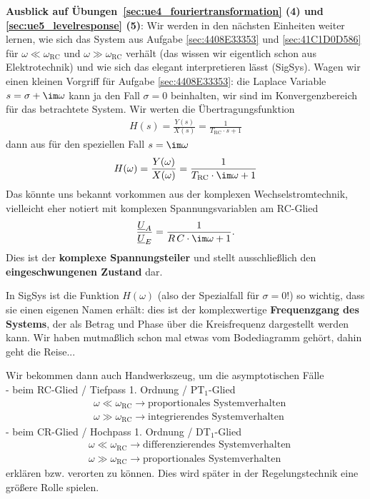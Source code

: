 \clearpage
\begin{mdframed}
\textbf{Ausblick auf Übungen~\ref{sec:ue4_fouriertransformation} (4) und
\ref{sec:ue5_levelresponse} (5)}:
Wir werden in den nächsten Einheiten weiter lernen, wie sich das System aus Aufgabe
\ref{sec:4408E33353} und \ref{sec:41C1D0D586}
für $\omega\ll\omega_\mathrm{RC}$ und $\omega\gg\omega_\mathrm{RC}$
verhält (das wissen wir eigentlich schon aus Elektrotechnik) und wie sich das elegant
interpretieren lässt (SigSys).
Wagen wir einen kleinen Vorgriff für Aufgabe \ref{sec:4408E33353}:
die Laplace Variable $s=\sigma + \im\omega$
kann ja den Fall $\sigma=0$ beinhalten, wir sind im Konvergenzbereich
für das betrachtete System. Wir werten die Übertragungsfunktion
\begin{align}
H(s) = \frac{Y(s)}{X(s)} = \frac{1}{T_\mathrm{RC} \cdot s + 1}
\end{align}
dann aus für den speziellen Fall $s=\im\omega$
\begin{align}
H(\omega) = \frac{Y(\omega)}{X(\omega)} =
\frac{1}{T_\mathrm{RC} \cdot \im\omega + 1}
\end{align}
Das könnte uns bekannt vorkommen aus der komplexen Wechselstromtechnik, vielleicht eher
notiert mit komplexen Spannungsvariablen am RC-Glied
\begin{align}
\frac{\underline{U}_A}{\underline{U}_E} =
\frac{1}{R\,C \cdot \im\omega + 1}.
\end{align}
Dies ist der \textbf{komplexe Spannungsteiler} und stellt
ausschließlich den \textbf{eingeschwungenen Zustand} dar.

In SigSys ist die Funktion $H(\omega)$ (also der Spezialfall
für $\sigma=0$!) so wichtig, dass sie einen eigenen Namen erhält: dies ist
der komplexwertige \textbf{Frequenzgang des Systems}, der als Betrag und Phase
über die Kreisfrequenz dargestellt werden kann.
Wir haben mutmaßlich schon mal etwas vom Bodediagramm gehört, dahin geht die Reise...

Wir bekommen dann auch Handwerkszeug, um die asymptotischen Fälle\\
\noindent - beim RC-Glied / Tiefpass 1. Ordnung / PT$_1$-Glied
\begin{align}
&\omega \ll \omega_\mathrm{RC} \rightarrow \text{proportionales Systemverhalten}\\
&\omega \gg \omega_\mathrm{RC} \rightarrow \text{integrierendes Systemverhalten}
\end{align}
%
- beim CR-Glied / Hochpass 1. Ordnung / DT$_1$-Glied
\begin{align}
&\omega \ll \omega_\mathrm{RC} \rightarrow \text{differenzierendes Systemverhalten}\\
&\omega \gg \omega_\mathrm{RC} \rightarrow \text{proportionales Systemverhalten}
\end{align}
erklären bzw. verorten zu können.
%
Dies wird später in der Regelungstechnik eine größere Rolle spielen.
\end{mdframed}

